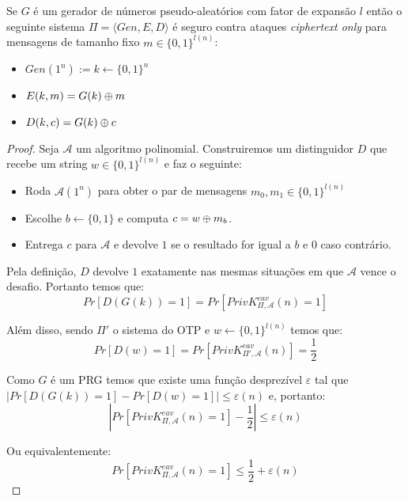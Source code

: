 \begin{theorem}
\label{theo:stream}
  Se $G$ é um gerador de números pseudo-aleatórios com fator de expansão $l$ então o seguinte sistema $\Pi = \langle Gen, E, D \rangle$ é seguro contra ataques {\em ciphertext only} para mensagens de tamanho fixo $m \in \{0,1\}^{l(n)}$:
\begin{itemize}
\item $Gen(1^n) := k \leftarrow \{0,1\}^n$
\item $E(k,m) = G(k) \oplus m$
\item $D(k,c) = G(k) \oplus c$
\end{itemize}
\end{theorem}
\begin{proof}
Seja $\mathcal{A}$ um algoritmo polinomial.
Construiremos um distinguidor $D$ que recebe um string $w \in \{0,1\}^{l(n)}$ e faz o seguinte:
\begin{itemize}
\item Roda $\mathcal{A}(1^n)$ para obter o par de mensagens $m_0, m_1 \in \{0,1\}^{l(n)}$
\item Escolhe $b \leftarrow \{0,1\}$ e computa $c = w \oplus m_b$.
\item Entrega $c$ para $\mathcal{A}$ e devolve $1$ se o resultado for igual a $b$ e $0$ caso contrário.
\end{itemize}

Pela definição, $D$ devolve $1$ exatamente nas mesmas situações em que $\mathcal{A}$ vence o desafio.
Portanto temos que:
\begin{displaymath}
Pr[D(G(k)) = 1] = Pr[PrivK^{eav}_{\Pi, \mathcal{A}}(n) = 1]  
\end{displaymath}

Além disso, sendo $\Pi'$ o sistema do OTP e $w \leftarrow \{0,1\}^{l(n)}$ temos que:
\begin{displaymath}
Pr[D(w) = 1] = Pr[PrivK^{eav}_{\Pi', \mathcal{A}}(n)] = \frac{1}{2}  
\end{displaymath}
 
Como $G$ é um PRG temos que existe uma função desprezível $\varepsilon$ tal que $|Pr[D(G(k)) = 1] - Pr[D(w) = 1]| \leq \varepsilon(n)$ e, portanto:
\begin{displaymath}
  |Pr[PrivK^{eav}_{\Pi, \mathcal{A}}(n) = 1] - \frac{1}{2}| \leq \varepsilon(n)
\end{displaymath}

Ou equivalentemente: 
\begin{displaymath}
   Pr[PrivK^{eav}_{\Pi, \mathcal{A}}(n) = 1] \leq \frac{1}{2} + \varepsilon(n)
\end{displaymath}
\end{proof}

